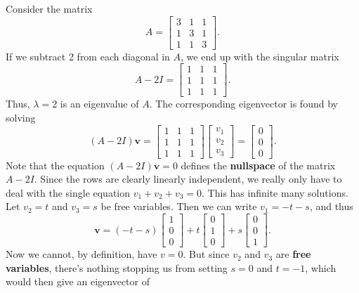 \documentclass[12pt]{article}
\renewcommand{\vec}[1]{\mathbf{#1}}
\theoremstyle{definition}
\begin{document}
\begin{example}
	Consider the matrix 
		\[	
			A=
			\begin{bmatrix}
				3	&	1	&	1 \\
				1	&	3	&	1\\
				1	&	1	&	3	
			\end{bmatrix}.
		\]	
	If we subtract 2 from each diagonal in $A$, we end up with the singular matrix 
		\[	
			A - 2I = \begin{bmatrix}
				1	&	1	&	1 \\
				1	&	1	&	1\\
				1	&	1	&	1	
			\end{bmatrix}.
		\]	
	Thus, $\lambda=2$ is an eigenvalue of $A$. The corresponding eigenvector is found by solving
	\[
		(A - 2I)\vec{v} = 
		\begin{bmatrix}
			1 & 1 & 1 \\
			1 & 1 & 1 \\
			1 & 1 & 1
		\end{bmatrix}
		\begin{bmatrix}
			v_1 \\ v_2 \\ v_3
		\end{bmatrix}=
		\begin{bmatrix}
			0 \\ 0 \\ 0
		\end{bmatrix}.
	\]
Note that the equation $(A - 2I)\vec{v}=0$ defines the \textbf{nullspace} of the matrix $A - 2I$. Since the rows are clearly linearly independent, we really only have to deal with the single equation $v_1+v_2+v_3 = 0$. This has infinite many solutions. Let $v_2=t$ and $v_3=s$ be free variables. Then we can write $v_1 = -t - s$, and thus 
	\[
		\vec{v} =
		(-t - s)\begin{bmatrix}
			1 \\ 0 \\ 0
		\end{bmatrix}	+
		t  \begin{bmatrix}
		0 \\ 1 \\ 0
			\end{bmatrix} + 
		s \begin{bmatrix}
			0 \\ 0 \\ 1
		\end{bmatrix}.
	\]
Now we cannot, by definition, have $v=0$. But since $v_2$ and $v_3$ are \textbf{free variables}, there's nothing stopping us from setting $s=0$ and $t=-1$, which would then give an eigenvector of

\end{example}
\end{document}
